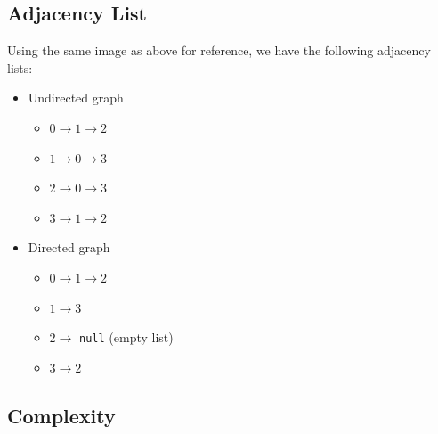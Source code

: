 \documentclass[
  10pt,
  english,
  letterpaper,
,tablecaptionabove
]{scrartcl}
\newcommand{\passthrough}[1]{#1}
\providecommand{\tightlist}{%
  \setlength{\itemsep}{0pt}\setlength{\parskip}{0pt}}
\begin{document}
\hypertarget{adjacency-list}{%
\subsection{Adjacency List}\label{adjacency-list}}

Using the same image as above for reference, we have the following
adjacency lists:

\begin{itemize}
\tightlist
\item
  Undirected graph

  \begin{itemize}
  \tightlist
  \item
    \(0 \rightarrow 1 \rightarrow 2\)
  \item
    \(1 \rightarrow 0 \rightarrow 3\)
  \item
    \(2 \rightarrow 0 \rightarrow 3\)
  \item
    \(3 \rightarrow 1 \rightarrow 2\)
  \end{itemize}
\item
  Directed graph

  \begin{itemize}
  \tightlist
  \item
    \(0 \rightarrow 1 \rightarrow 2\)
  \item
    \(1 \rightarrow 3\)
  \item
    \(2 \rightarrow\) \passthrough{\lstinline!null!} (empty list)
  \item
    \(3 \rightarrow 2\)
  \end{itemize}
\end{itemize}

\hypertarget{complexity}{%
\subsection{Complexity}\label{complexity}}
\end{document}
